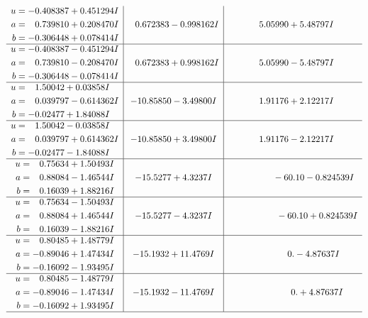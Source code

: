 \documentclass[1p]{elsarticle_modified}
\theoremstyle{definition}
\begin{document}
$$\begin{array}{c|c|c}
\begin{aligned}
u &= -0.408387 + 0.451294 I \\
a &= \phantom{-}0.739810 + 0.208470 I \\
b &= -0.306448 + 0.078414 I\end{aligned}
 & \phantom{-}0.672383 - 0.998162 I & \phantom{-}5.05990 + 5.48797 I \\ \hline\begin{aligned}
u &= -0.408387 - 0.451294 I \\
a &= \phantom{-}0.739810 - 0.208470 I \\
b &= -0.306448 - 0.078414 I\end{aligned}
 & \phantom{-}0.672383 + 0.998162 I & \phantom{-}5.05990 - 5.48797 I \\ \hline\begin{aligned}
u &= \phantom{-}1.50042 + 0.03858 I \\
a &= \phantom{-}0.039797 - 0.614362 I \\
b &= -0.02477 + 1.84088 I\end{aligned}
 & -10.85850 - 3.49800 I & \phantom{-}1.91176 + 2.12217 I \\ \hline\begin{aligned}
u &= \phantom{-}1.50042 - 0.03858 I \\
a &= \phantom{-}0.039797 + 0.614362 I \\
b &= -0.02477 - 1.84088 I\end{aligned}
 & -10.85850 + 3.49800 I & \phantom{-}1.91176 - 2.12217 I \\ \hline\begin{aligned}
u &= \phantom{-}0.75634 + 1.50493 I \\
a &= \phantom{-}0.88084 - 1.46544 I \\
b &= \phantom{-}0.16039 + 1.88216 I\end{aligned}
 & -15.5277 + 4.3237 I & \phantom{-0.000000 }      -6
0. 10   - 0.824539 I \\ \hline\begin{aligned}
u &= \phantom{-}0.75634 - 1.50493 I \\
a &= \phantom{-}0.88084 + 1.46544 I \\
b &= \phantom{-}0.16039 - 1.88216 I\end{aligned}
 & -15.5277 - 4.3237 I & \phantom{-0.000000 -}     -6
0. 10   + 0.824539 I \\ \hline\begin{aligned}
u &= \phantom{-}0.80485 + 1.48779 I \\
a &= -0.89046 + 1.47434 I \\
b &= -0.16092 - 1.93495 I\end{aligned}
 & -15.1932 + 11.4769 I & \phantom{-0.000000 } 0. - 4.87637 I \\ \hline\begin{aligned}
u &= \phantom{-}0.80485 - 1.48779 I \\
a &= -0.89046 - 1.47434 I \\
b &= -0.16092 + 1.93495 I\end{aligned}
 & -15.1932 - 11.4769 I & \phantom{-0.000000 -}0. + 4.87637 I\\
 \hline 
 \end{array}$$\newpage\newpage\renewcommand{\arraystretch}{1}
\end{document}
